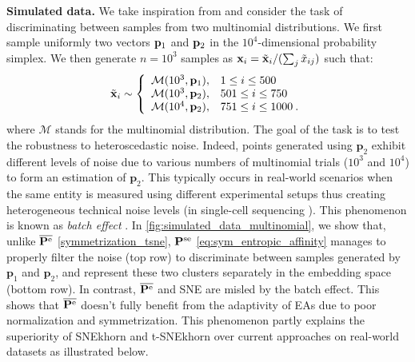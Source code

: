 \textbf{Simulated data.}
We take inspiration from \cite{landa2021doubly} and consider the task of discriminating between samples from two multinomial distributions. We first sample uniformly two vectors $\mathbf{p}_1$ and $\mathbf{p}_2$ in the $10^4$-dimensional probability simplex. We then generate $n=10^3$ samples as $\mathbf{x}_i =\tilde{\mathbf{x}}_i / (\sum_j \tilde{x}_{ij})$ such that:
\begin{align*}
    \tilde{\mathbf{x}}_i \sim 
    \left\{
    \begin{array}{ll}
        \mathcal{M}(10^3, \mathbf{p}_1), & 1\leq i \leq 500 \\
        \mathcal{M}(10^3, \mathbf{p}_2), & 501\leq i \leq 750 \\
        \mathcal{M}(10^4, \mathbf{p}_2), & 751\leq i \leq 1000 \:.
    \end{array}
    \right.
\end{align*}
where $\mathcal{M}$ stands for the multinomial distribution. 
The goal of the task is to test the robustness to heteroscedastic noise. Indeed, points generated using $\mathbf{p}_2$ exhibit different levels of noise due to various numbers of multinomial trials ($10^3$ and $10^4$) to form an estimation of $\mathbf{p}_2$. This typically occurs in real-world scenarios when the same entity is measured using different experimental setups thus creating heterogeneous technical noise levels (\eg in single-cell sequencing \cite{kobak2019art}). This phenomenon is known as \emph{batch effect} \cite{tran2020benchmark}.
In \cref{fig:simulated_data_multinomial}, we show that, unlike $\overline{\mathbf{P}^{\mathrm{e}}}$ \eqref{symmetrization_tsne}, $\mathbf{P}^{\mathrm{se}}$ \eqref{eq:sym_entropic_affinity} manages to properly filter the noise (top row) to discriminate between samples generated by $\mathbf{p}_1$ and $\mathbf{p}_2$, and represent these two clusters separately in the embedding space (bottom row). In contrast, $\overline{\mathbf{P}^{\mathrm{e}}}$ and SNE are misled by the batch effect. This shows that $\overline{\mathbf{P}^{\mathrm{e}}}$ doesn't fully benefit from the adaptivity of EAs due to poor normalization and symmetrization. This phenomenon partly explains the superiority of SNEkhorn and t-SNEkhorn over current approaches on real-world datasets as illustrated below. 

